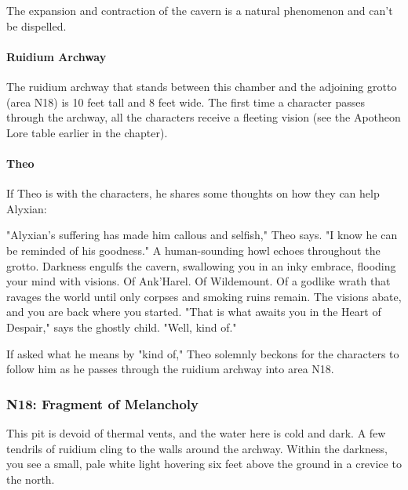 \documentclass[a4paper, 11pt, bg=full, twocolumn, nooutline]{dndbook}
\begin{document}
The expansion and contraction of the cavern is a natural phenomenon and can't be dispelled.

\paragraph{Ruidium Archway}

The ruidium archway that stands between this chamber and the adjoining grotto (area N18) is 10 feet tall and 8 feet wide. The first time a character passes through the archway, all the characters receive a fleeting vision (see the Apotheon Lore table earlier in the chapter).

\paragraph{Theo}

If Theo is with the characters, he shares some thoughts on how they can help Alyxian:

\begin{DndReadAloud}
"Alyxian's suffering has made him callous and selfish," Theo says. "I know he can be reminded of his goodness."
A human-sounding howl echoes throughout the grotto. Darkness engulfs the cavern, swallowing you in an inky embrace, flooding your mind with visions. Of Ank'Harel. Of Wildemount. Of a godlike wrath that ravages the world until only corpses and smoking ruins remain. The visions abate, and you are back where you started. "That is what awaits you in the Heart of Despair," says the ghostly child. "Well, kind of."
\end{DndReadAloud}

If asked what he means by "kind of," Theo solemnly beckons for the characters to follow him as he passes through the ruidium archway into area N18.


\subsubsection{N18: Fragment of Melancholy}

\begin{DndReadAloud}
This pit is devoid of thermal vents, and the water here is cold and dark. A few tendrils of ruidium cling to the walls around the archway. Within the darkness, you see a small, pale white light hovering six feet above the ground in a crevice to the north.
\end{DndReadAloud}
\end{document}
